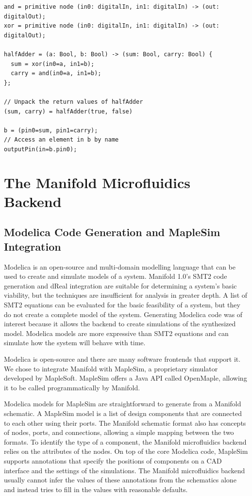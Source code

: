\begin{lstlisting}[label=lst:unpacking, caption=Examples of new tuple features]
and = primitive node (in0: digitalIn, in1: digitalIn) -> (out: digitalOut);
xor = primitive node (in0: digitalIn, in1: digitalIn) -> (out: digitalOut);

halfAdder = (a: Bool, b: Bool) -> (sum: Bool, carry: Bool) {
  sum = xor(in0=a, in1=b);
  carry = and(in0=a, in1=b);
};

// Unpack the return values of halfAdder
(sum, carry) = halfAdder(true, false)

b = (pin0=sum, pin1=carry);
// Access an element in b by name
outputPin(in=b.pin0);
\end{lstlisting}

\section{The Manifold Microfluidics Backend}

\subsection{Modelica Code Generation and MapleSim Integration}

Modelica is an open-source and multi-domain modelling language that can be used
to create and simulate models of a system. \cite{Maplesim}\cite{modelica}
Manifold 1.0's SMT2 code generation and dReal integration are suitable for
determining a system's basic viability, but the techniques are insufficient for
analysis in greater depth.
A list of SMT2 equations can be evaluated for the basic feasibility of a system, but they do not create
a complete model of the system.
Generating Modelica code was of interest because it allows the backend to create simulations of the
synthesized model.
Modelica models are more expressive than SMT2 equations and can simulate how the system will behave with time. 

Modelica is open-source and there are many software frontends that support it.
We chose to integrate Manifold with MapleSim, a proprietary simulator developed by MapleSoft.
MapleSim offers a Java API called OpenMaple, allowing it to be called programmatically by Manifold.

Modelica models for MapleSim are straightforward to generate from a Manifold schematic.
A MapleSim model is a list of design components that are connected to each other using their ports.
The Manifold schematic format also has concepts of nodes, ports, and connections, allowing a simple mapping
between the two formats.
To identify the type of a component, the Manifold microfluidics backend relies on the attributes of the nodes.
On top of the core Modelica code, MapleSim supports annotations that specify the positions of components on a CAD interface and the settings of the simulations.
The Manifold microfluidics backend usually cannot infer the values of these annotations from the schematics
alone and instead tries to fill in the values with reasonable defaults.

